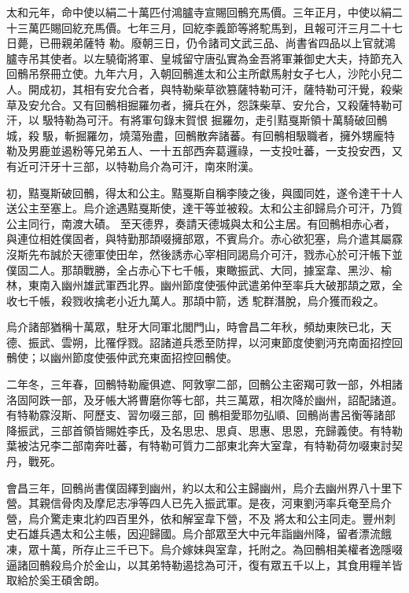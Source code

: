 \begin{pinyinscope}
 太和元年，命中使以絹二十萬匹付鴻臚寺宣賜回鶻充馬價。三年正月，中使以絹二十三萬匹賜回紇充馬價。七年三月，回紇李義節等將駝馬到，且報可汗三月二十七日薨，已冊親弟薩特
 勒。廢朝三日，仍令諸司文武三品、尚書省四品以上官就鴻臚寺吊其使者。以左驍衛將軍、皇城留守唐弘實為金吾將軍兼御史大夫，持節充入回鶻吊祭冊立使。九年六月，入朝回鶻進太和公主所獻馬射女子七人，沙陀小兒二人。開成初，其相有安允合者，與特勒柴草欲篡薩特勒可汗，薩特勒可汗覺，殺柴草及安允合。又有回鶻相掘羅勿者，擁兵在外，怨誅柴草、安允合，又殺薩特勒可汗，以馺特勒為可汗。有將軍句錄末賀恨
 掘羅勿，走引黠戛斯領十萬騎破回鶻城，殺馺，斬掘羅勿，燒蕩殆盡，回鶻散奔諸蕃。有回鶻相馺職者，擁外甥龐特勒及男鹿並遏粉等兄弟五人、一十五部西奔葛邏祿，一支投吐蕃，一支投安西，又有近可汗牙十三部，以特勒烏介為可汗，南來附漢。



 初，黠戛斯破回鶻，得太和公主。黠戛斯自稱李陵之後，與國同姓，遂令達干十人送公主至塞上。烏介途遇黠戛斯使，達干等並被殺。太和公主卻歸烏介可汗，乃質公主同行，南渡大磧。
 至天德界，奏請天德城與太和公主居。有回鶻相赤心者，與連位相姓僕固者，與特勤那頡啜擁部眾，不賓烏介。赤心欲犯塞，烏介遣其屬霡沒斯先布誠於天德軍使田牟，然後誘赤心宰相同謁烏介可汗，戮赤心於可汗帳下並僕固二人。那頡戰勝，全占赤心下七千帳，東瞰振武、大同，據室韋、黑沙、榆林，東南入幽州雄武軍西北界。幽州節度使張仲武遣弟仲至率兵大破那頡之眾，全收七千帳，殺戮收擒老小近九萬人。那頡中箭，透
 駝群潛脫，烏介獲而殺之。



 烏介諸部猶稱十萬眾，駐牙大同軍北閭門山，時會昌二年秋，頻劫東陜已北，天德、振武、雲朔，比罹俘戮。詔諸道兵悉至防捍，以河東節度使劉沔充南面招控回鶻使；以幽州節度使張仲武充東面招控回鶻使。



 二年冬，三年春，回鶻特勒龐俱遮、阿敦寧二部，回鶻公主密羯可敦一部，外相諸洛固阿跌一部，及牙帳大將曹磨你等七部，共三萬眾，相次降於幽州，詔配諸道。有特勒霡沒斯、阿歷支、習勿啜三部，回
 鶻相愛耶勿弘順、回鶻尚書呂衡等諸部降振武，三部首領皆賜姓李氏，及名思忠、思貞、思惠、思恩，充歸義使。有特勒葉被沽兄李二部南奔吐蕃，有特勒可質力二部東北奔大室韋，有特勒荷勿啜東討契丹，戰死。



 會昌三年，回鶻尚書僕固繹到幽州，約以太和公主歸幽州，烏介去幽州界八十里下營。其親信骨肉及摩尼志凈等四人已先入振武軍。是夜，河東劉沔率兵奄至烏介營，烏介驚走東北約四百里外，依和解室韋下營，不及
 將太和公主同走。豐州刺史石雄兵遇太和公主帳，因迎歸國。烏介部眾至大中元年詣幽州降，留者漂流餓凍，眾十萬，所存止三千已下。烏介嫁妹與室韋，托附之。為回鶻相美權者逸隱啜逼諸回鶻殺烏介於金山，以其弟特勒遏捻為可汗，復有眾五千以上，其食用糧羊皆取給於奚王碩舍朗。




\end{pinyinscope}
